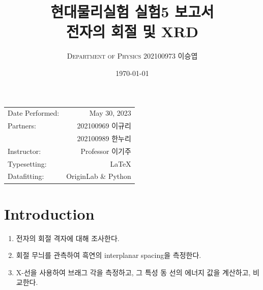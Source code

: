 \documentclass[a4paper, 10pt, nanum]{CSUniSchoolLabReport}
\title{현대물리실험 실험5 보고서 \\ 전자의 회절 및 XRD} %
\author{\textsc{Department of Physics} 202100973 이승엽}
\date{\today}
\begin{document}
\maketitle %

\begin{center}
	\begin{tabular}{l r}
		Date Performed: & May 30, 2023 \\ %
		Partners: & 202100969 이규리 \\ %
		& 202100989 한누리 \\
		Instructor: & Professor 이기주 \\ %
		Typesetting: & LaTeX \\
		Datafitting: & OriginLab \& Python \\
	\end{tabular}
\end{center}


\maketitle


\section{Introduction}

\begin{enumerate}[label=\arabic*.]
	\item 전자의 회절 격자에 대해 조사한다.
	\item 회절 무늬를 관측하여 흑연의 interplanar spacing을 측정한다.
	\item X-선을 사용하여 브래그 각을 측정하고, 그 특성 동 선의 에너지 값을 계산하고, 비교한다.
\end{enumerate}
\end{document}
